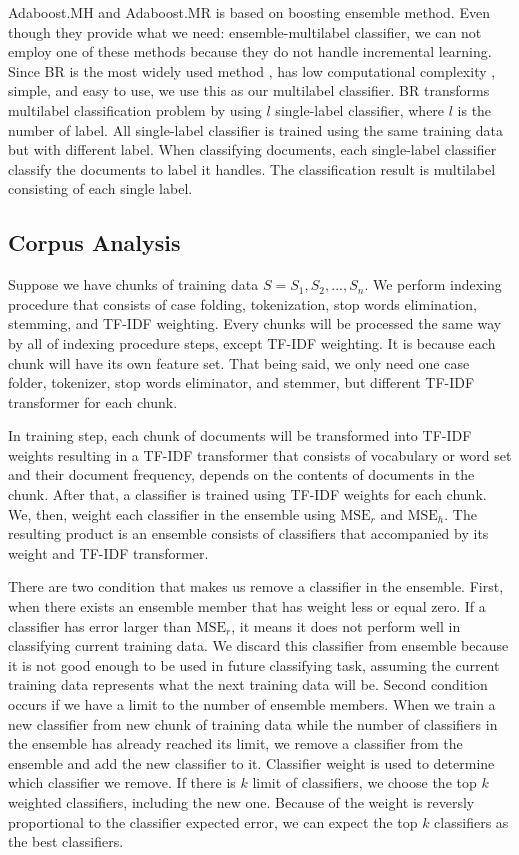 \documentclass[conference]{IEEEtran}
\begin{document}
Adaboost.MH and Adaboost.MR is based on boosting ensemble method.
Even though they provide what we need: ensemble-multilabel classifier, we can not employ one of these methods because they do not handle incremental learning.
Since BR is the most widely used method \cite{santos}, has low computational complexity \cite{cherman}, simple, and easy to use, we use this as our multilabel classifier.
BR transforms multilabel classification problem by using $l$ single-label classifier, where $l$ is the number of label.
All single-label classifier is trained using the same training data but with different label.
When classifying documents, each single-label classifier classify the documents to label it handles.
The classification result is multilabel consisting of each single label.

\subsection{Corpus Analysis}

Suppose we have chunks of training data $S = {S_1, S_2, ..., S_n}$.
We perform indexing procedure that consists of case folding, tokenization, stop words elimination, stemming, and TF-IDF weighting.
Every chunks will be processed the same way by all of indexing procedure steps, except TF-IDF weighting.
It is because each chunk will have its own feature set.
That being said, we only need one case folder, tokenizer, stop words eliminator, and stemmer, but different TF-IDF transformer for each chunk.

In training step, each chunk of documents will be transformed into TF-IDF weights resulting in a TF-IDF transformer that consists of vocabulary or word set and their document frequency, depends on the contents of documents in the chunk.
After that, a classifier is trained using TF-IDF weights for each chunk.
We, then, weight each classifier in the ensemble using $\text{MSE}_r$ and $\text{MSE}_h$.
The resulting product is an ensemble consists of classifiers that accompanied by its weight and TF-IDF transformer.

There are two condition that makes us remove a classifier in the ensemble.
First, when there exists an ensemble member that has weight less or equal zero.
If a classifier has error larger than $\text{MSE}_r$, it means it does not perform well in classifying current training data.
We discard this classifier from ensemble because it is not good enough to be used in future classifying task, assuming the current training data represents what the next training data will be.
Second condition occurs if we have a limit to the number of ensemble members.
When we train a new classifier from new chunk of training data while the number of classifiers in the ensemble has already reached its limit, we remove a classifier from the ensemble and add the new classifier to it.
Classifier weight is used to determine which classifier we remove.
If there is $k$ limit of classifiers, we choose the top $k$ weighted classifiers, including the new one.
Because of the weight is reversly proportional to the classifier expected error, we can expect the top $k$ classifiers as the best classifiers.
\end{document}
